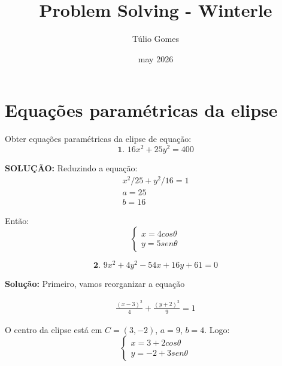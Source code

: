 \title{Problem Solving - Winterle}
\author{Túlio Gomes}
\date{may 2026}

\maketitle

\section{Equações paramétricas da elipse}

Obter equações paramétricas da elipse de equação:
\begin{equation}
    \textbf{1. } 16x^2 + 25y^2 = 400
\end{equation}

\textbf{SOLUÇÃO: } Reduzindo a equação:
\begin{equation}
    \begin{split}
        x^2/25 + y^2/16 = 1 \\
        a=25\\
        b=16
    \end{split}
\end{equation}

Então:
\begin{equation}
    \left\{
        \begin{split}
            x = 4cos \theta \\
            y = 5sen \theta
        \end{split}
    \right.
\end{equation}

\begin{equation}
    \textbf{2. } 9x^2 + 4y^2 - 54x + 16y + 61 = 0
\end{equation}

\textbf{Solução: } Primeiro, vamos reorganizar a equação

\begin{equation}
    \begin{split}
        \frac{(x - 3)^2}{4} + \frac{(y+2)^2}{9}=1
    \end{split}
\end{equation}

O centro da elipse está em $C=(3, -2)$, $a=9$, $b=4$. Logo:
\begin{equation}
    \left\{
        \begin{split}
            x = 3 + 2cos \theta \\
            y = -2 + 3sen \theta
        \end{split}
    \right.
\end{equation}

